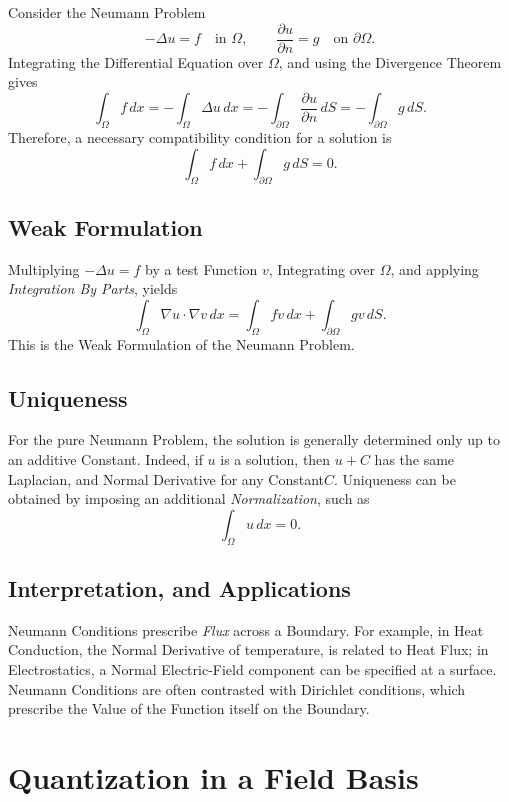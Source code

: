 \documentclass[a4paper, 10pt, onepage]{elegantbook}
\begin{document}
{Consider the Neumann Problem
\[
-\Delta u=f \quad \text{in } \Omega,
\qquad
\frac{\partial u}{\partial n}=g \quad \text{on } \partial\Omega.
\]
Integrating the Differential Equation over \(\Omega\), and using the
Divergence Theorem gives
\[
\int_\Omega f\,dx
=-\int_\Omega\Delta u\,dx
=-\int_{\partial\Omega}\frac{\partial u}{\partial n}\,dS
=-\int_{\partial\Omega}g\,dS.
\]
Therefore, a necessary compatibility condition for a solution is
\[
\boxed{
\int_\Omega f\,dx
+\int_{\partial\Omega}g\,dS=0
}.
\]

\subsection{Weak Formulation}

Multiplying \(-\Delta u=f\) by a test Function \(v\), Integrating over \(\Omega\), and applying \emph{Integration By 
Parts}, yields
\[
\int_\Omega \nabla u\cdot\nabla v\,dx
=
\int_\Omega f v\,dx
+\int_{\partial\Omega}g v\,dS.
\]
This is the Weak Formulation of the Neumann Problem.

\subsection{Uniqueness}

For the pure Neumann Problem, the solution is generally determined only up to an additive Constant. Indeed, if \(u\) is 
a solution, then
\(u+C\) has the same Laplacian, and Normal Derivative for any Constant\(C\). Uniqueness can be obtained by imposing an 
additional \emph{Normalization}, such as
\[
\int_\Omega u\,dx=0.
\]

\subsection{Interpretation, and Applications}

Neumann Conditions prescribe \emph{Flux} across a Boundary. For example, in Heat Conduction, the Normal Derivative of 
temperature, is related
to Heat Flux; in Electrostatics, a Normal Electric-Field component can be specified at a surface. Neumann Conditions 
are often contrasted with Dirichlet conditions, which prescribe the Value of the Function itself on the Boundary.












\section{Quantization in a Field Basis}

}
\end{document}
